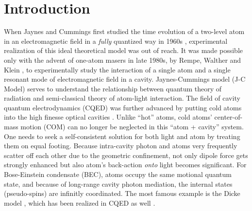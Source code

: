 \documentclass[atoms,article,submit,moreauthors,pdftex,12pt,a4paper]{mdpi}
\begin{document}

\section{Introduction}

When Jaynes and Cummings first studied the time evolution of a two-level atom in an electromagnetic field in a {\em fully} quantized way in 1960s \cite{JCM}, experimental realization of this ideal theoretical model was out of reach. It was made possible only with the advent of one-atom masers in late 1980s, by Rempe, Walther and Klein \cite{exp1987}, to experimentally study the interaction of a single atom and a single resonant mode of electromagnetic field in a cavity. Jaynes-Cummings model (J-C Model) serves to understand the relationship between quantum theory of radiation and semi-classical theory of atom-light interaction. 
The field of cavity quantum electrodynamics (CQED) was further advanced by putting cold atoms into the high finesse optical cavities \cite{cavity1, cavity2, cavity3}. Unlike ``hot'' atoms, cold atoms' center-of-mass motion (COM) can no longer be neglected in this ``atom + cavity'' system. One needs to seek a self-consistent solution for both light and atom by treating them on equal footing. Because intra-cavity photon and atoms very frequently scatter off each other due to the geometric confinement, not only dipole force gets strongly enhanced but also atom's back-action {\em onto} light becomes significant. For Bose-Einstein condensate (BEC), atoms occupy the same motional quantum state, 
and because of long-range cavity photon mediation, the internal states (pseudo-spins) are infinitly coordinated. The most famous example is the Dicke model \cite{Dicke}, which has been realized in CQED as well \cite{Esslinger2010}.
\end{document}
